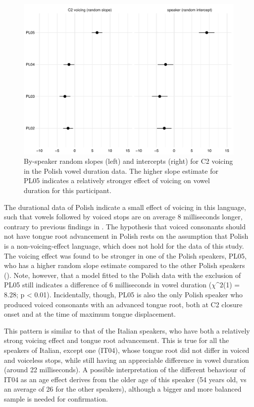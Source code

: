 \documentclass[authoryear, twocolumn]{elsarticle}
\begin{document}
\begin{figure}
    \centering
    \includegraphics[height=.35\textwidth]{fig/polish-re.pdf}
    \caption{By-speaker random slopes (left) and intercepts (right) for C2 voicing in the Polish vowel duration data. The higher slope estimate for PL05 indicates a relatively stronger effect of voicing on vowel duration for this participant.}
    \label{f:polish-re}
\end{figure}

The durational data of Polish indicate a small effect of voicing in this
language, such that vowels followed by voiced stops are on average 8
milliseconds longer, contrary to previous findings in
\citet{keating1984}. The hypothesis that voiced consonants should not
have tongue root advancement in Polish rests on the assumption that
Polish is a non-voicing-effect language, which does not hold for the
data of this study. The voicing effect was found to be stronger in one
of the Polish speakers, PL05, who has a higher random slope estimate
compared to the other Polish speakers (). Note,
however, that a model fitted to the Polish data with the exclusion of
PL05 still indicates a difference of 6 milliseconds in vowel duration
(\(\chi\^2\)(1) = 8.28; p \textless{} 0.01). Incidentally, though, PL05
is also the only Polish speaker who produced voiced consonants with an
advanced tongue root, both at C2 closure onset and at the time of
maximum tongue displacement.

This pattern is similar to that of the Italian speakers, who have both a
relatively strong voicing effect and tongue root advancement. This is
true for all the speakers of Italian, except one (IT04), whose tongue
root did not differ in voiced and voiceless stops, while still having an
appreciable difference in vowel duration (around 22 milliseconds). A
possible interpretation of the different behaviour of IT04 as an age
effect derives from the older age of this speaker (54 years old, vs an
average of 26 for the other speakers), although a bigger and more
balanced sample is needed for confirmation.
\end{document}
